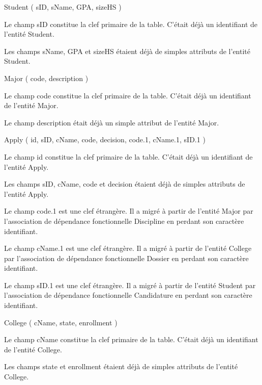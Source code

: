 \documentclass[11pt]{article}
\begin{document}
\hypertarget{mld}{}
{Student} ( {sID}, {sName}, {GPA}, {sizeHS} )

Le champ sID constitue la clef primaire de la table. C'était déjà un
identifiant de l'entité Student.

Les champs sName, GPA et sizeHS étaient déjà de simples attributs de
l'entité Student.

{Major} ( {code}, {description} )

Le champ code constitue la clef primaire de la table. C'était déjà un
identifiant de l'entité Major.

Le champ description était déjà un simple attribut de l'entité Major.

{Apply} ( {id}, {sID}, {cName}, {code}, {decision}, {code.1}, {cName.1},
{sID.1} )

Le champ id constitue la clef primaire de la table. C'était déjà un
identifiant de l'entité Apply.

Les champs sID, cName, code et decision étaient déjà de simples
attributs de l'entité Apply.

Le champ code.1 est une clef étrangère. Il a migré à partir de l'entité
Major par l'association de dépendance fonctionnelle Discipline en
perdant son caractère identifiant.

Le champ cName.1 est une clef étrangère. Il a migré à partir de l'entité
College par l'association de dépendance fonctionnelle Dossier en perdant
son caractère identifiant.

Le champ sID.1 est une clef étrangère. Il a migré à partir de l'entité
Student par l'association de dépendance fonctionnelle Candidature en
perdant son caractère identifiant.

{College} ( {cName}, {state}, {enrollment} )

Le champ cName constitue la clef primaire de la table. C'était déjà un
identifiant de l'entité College.

Les champs state et enrollment étaient déjà de simples attributs de
l'entité College.


    
    
    
    
\end{document}
